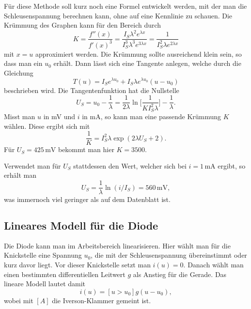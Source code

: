 \documentclass[a4paper,10pt,fleqn,twocolumn,twoside]{article}
\numberwithin{equation}{section}
\begin{document}
Für diese Methode soll kurz noch eine Formel entwickelt werden,
mit der man die Schleusenspannung berechnen kann, ohne
auf eine Kennlinie zu schauen. Die Krümmung des Graphen kann für den
Bereich durch
\begin{equation}
K = \frac{f''(x)}{f'(x)^3}
= \frac{I_S\lambda^2 e^{\lambda x}}{I_S^3\lambda^3 e^{3\lambda x}}
= \frac{1}{I_S^2\lambda e^{2\lambda x}}
\end{equation}
mit $x=u$ approximiert werden. Die Krümmung sollte ausreichend
klein sein, so dass man ein $u_0$ erhält.
Dann lässt sich eine Tangente anlegen, welche
durch die Gleichung
\begin{equation}
T(u) = I_S e^{\lambda u_0}+I_S \lambda e^{\lambda u_0}(u-u_0)
\end{equation}
beschrieben wird. Die Tangentenfunktion hat die Nullstelle
\begin{equation}
U_S = u_0-\frac{1}{\lambda} = \frac{1}{2\lambda}
\ln\bigg[\frac{1}{KI_S^2\lambda}\bigg]-\frac{1}{\lambda}.
\end{equation}
Misst man $u$ in mV und $i$ in mA, so kann man eine passende
Krümmung $K$ wählen. Diese ergibt sich mit
\begin{equation}
\frac{1}{K} = I_S^2\lambda\exp(2\lambda U_S+2).
\end{equation}
Für $U_S=425\,\mathrm{mV}$ bekommt man hier $K=3500$.

Verwendet man für $U_S$ stattdessen den Wert, welcher sich
bei $i=1\,\mathrm{mA}$ ergibt, so erhält man
\begin{equation}
U_S = \frac{1}{\lambda}\ln(i/I_S) = 560\,\mathrm{mV},
\end{equation}
was immernoch viel geringer als auf dem Datenblatt ist.

\subsection{Lineares Modell für die Diode}
Die Diode kann man im Arbeitsbereich linearisieren.
Hier wählt man für die Knickstelle eine Spannung $u_0$,
die mit der Schleusenspannung übereinstimmt oder kurz davor
liegt. Vor dieser Knickstelle setzt man $i(u)=0$. Danach
wählt man einen bestimmten differentiellen Leitwert $g$
als Anstieg für die Gerade. Das lineare Modell lautet
damit
\begin{equation}
i(u) = [u>u_0]g(u-u_0),
\end{equation}
wobei mit $[A]$ die Iverson-Klammer gemeint ist.
\end{document}
